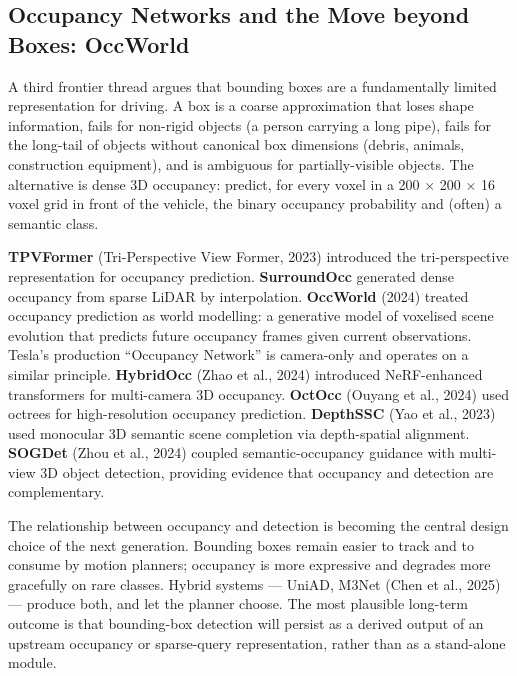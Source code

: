 \subsection{Occupancy Networks and the Move beyond Boxes: OccWorld}\label{occupancy-networks-and-the-move-beyond-boxes-occworld}

A third frontier thread argues that bounding boxes are a fundamentally limited representation for driving. A box is a coarse approximation that loses shape information, fails for non-rigid objects (a person carrying a long pipe), fails for the long-tail of objects without canonical box dimensions (debris, animals, construction equipment), and is ambiguous for partially-visible objects. The alternative is dense 3D occupancy: predict, for every voxel in a 200 × 200 × 16 voxel grid in front of the vehicle, the binary occupancy probability and (often) a semantic class.

\textbf{TPVFormer} (Tri-Perspective View Former, 2023) introduced the tri-perspective representation for occupancy prediction. \textbf{SurroundOcc} generated dense occupancy from sparse LiDAR by interpolation. \textbf{OccWorld} (2024) treated occupancy prediction as world modelling: a generative model of voxelised scene evolution that predicts future occupancy frames given current observations. Tesla's production ``Occupancy Network'' is camera-only and operates on a similar principle. \textbf{HybridOcc} (Zhao et al., 2024) introduced NeRF-enhanced transformers for multi-camera 3D occupancy. \textbf{OctOcc} (Ouyang et al., 2024) used octrees for high-resolution occupancy prediction. \textbf{DepthSSC} (Yao et al., 2023) used monocular 3D semantic scene completion via depth-spatial alignment. \textbf{SOGDet} (Zhou et al., 2024) coupled semantic-occupancy guidance with multi-view 3D object detection, providing evidence that occupancy and detection are complementary.

The relationship between occupancy and detection is becoming the central design choice of the next generation. Bounding boxes remain easier to track and to consume by motion planners; occupancy is more expressive and degrades more gracefully on rare classes. Hybrid systems --- UniAD, M3Net (Chen et al., 2025) --- produce both, and let the planner choose. The most plausible long-term outcome is that bounding-box detection will persist as a derived output of an upstream occupancy or sparse-query representation, rather than as a stand-alone module.

